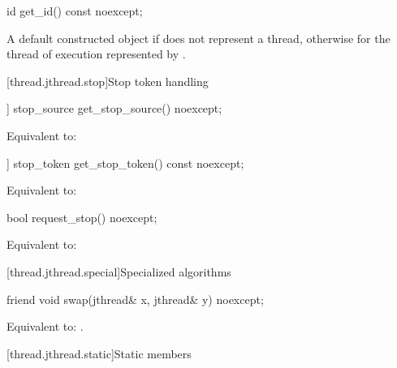 %
\begin{itemdecl}
id get_id() const noexcept;
\end{itemdecl}

\begin{itemdescr}
\pnum
\returns
A default constructed  object
if  does not represent a thread,
otherwise 
for the thread of execution represented by .
\end{itemdescr}

[thread.jthread.stop]{Stop token handling}

%
\begin{itemdecl}
[[nodiscard]] stop_source get_stop_source() noexcept;
\end{itemdecl}

\begin{itemdescr}
\pnum
\effects
Equivalent to: 
\end{itemdescr}

%
\begin{itemdecl}
[[nodiscard]] stop_token get_stop_token() const noexcept;
\end{itemdecl}

\begin{itemdescr}
\pnum
\effects
Equivalent to: 
\end{itemdescr}

%
\begin{itemdecl}
bool request_stop() noexcept;
\end{itemdecl}

\begin{itemdescr}
\pnum
\effects
Equivalent to: 
\end{itemdescr}


[thread.jthread.special]{Specialized algorithms}

%
\begin{itemdecl}
friend void swap(jthread& x, jthread& y) noexcept;
\end{itemdecl}

\begin{itemdescr}
\pnum
\effects
Equivalent to: .
\end{itemdescr}

[thread.jthread.static]{Static members}

